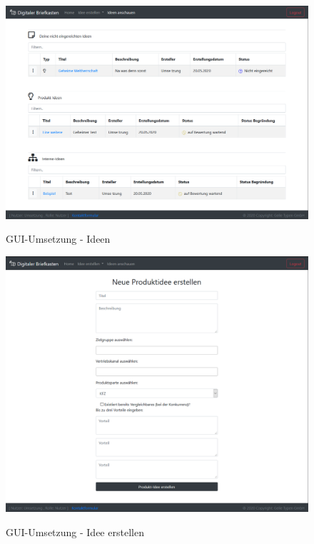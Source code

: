 \begin{figure}[h]
    \centering
    \begin{minipage}[t]{1\textwidth}
        \caption{GUI-Umsetzung - Ideen}
        \includegraphics[width=1\textwidth]{img/ideen-umsetzung.png}\\
    \end{minipage}
\end{figure}

\begin{figure}[h]
    \centering
    \begin{minipage}[t]{1\textwidth}
        \caption{GUI-Umsetzung - Idee erstellen }
        \includegraphics[width=1\textwidth]{img/createIdea-umsetzung.png}\\
    \end{minipage}
\end{figure}

